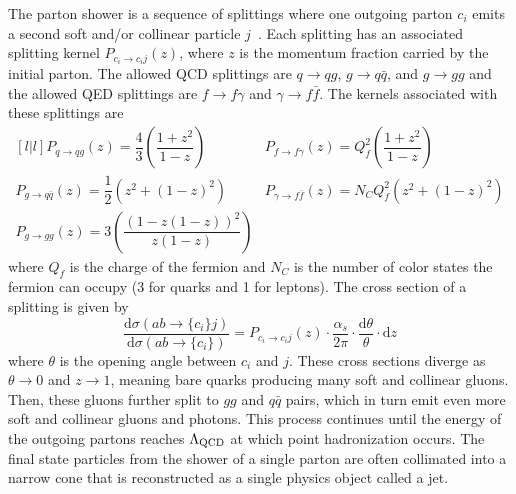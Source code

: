 The parton shower is a sequence of splittings where one outgoing parton $c_i$ emits a second soft and/or collinear particle $j$~\cite{Sjostrand2015}.
Each splitting has an associated splitting kernel $P_{c_i \rightarrow c_i j}(z)$, where $z$ is the momentum fraction carried by the initial parton.
The allowed QCD splittings are $q\rightarrow qg$, $g\rightarrow q \bar q$, and $g\rightarrow gg$ and the allowed QED splittings are $f\rightarrow f\gamma$ and $\gamma \rightarrow f \bar f$.
The kernels associated with these splittings are
\begin{equation}
  \begin{matrix}[l | l]
    P_{q\rightarrow qg}(z) = \dfrac{4}{3} \left( \dfrac{1+z^2}{1-z} \right)
    & P_{f \rightarrow f \gamma}(z) = Q_f^2 \left( \dfrac{1+z^2}{1-z} \right)
    \\ P_{g\rightarrow q \bar q}(z) = \dfrac{1}{2} \left( z^2 + (1-z)^2\right)
    & P_{\gamma \rightarrow f \bar f}(z) = N_C Q_f^2 \left( z^2 + (1-z)^2 \right) 
    \\ P_{g\rightarrow gg}(z) = 3 \left( \dfrac{(1-z(1-z))^2}{z(1-z)} \right)  & 
  \end{matrix}
\end{equation}
where $Q_f$ is the charge of the fermion and $N_C$ is the number of color states the fermion can occupy (3 for quarks and 1 for leptons).
The cross section of a splitting is given by
\begin{equation}
  \frac{\text{d}\sigma (ab\rightarrow \{c_i\}j)}{\text{d}\sigma (ab\rightarrow \{c_i\})}
  = P_{c_i\rightarrow c_i j}(z) \cdot \frac{\alpha_s}{2\pi} \cdot \frac{\text{d}\theta}{\theta} \cdot \text{d}z 
\end{equation}
where $\theta$ is the opening angle between $c_i$ and $j$.
These cross sections diverge as $\theta \rightarrow 0$ and $z \rightarrow 1$, meaning bare quarks producing many soft and collinear gluons.
Then, these gluons further split to $gg$ and $q\bar q$ pairs, which in turn emit even more soft and collinear gluons and photons.
This process continues until the energy of the outgoing partons reaches $\Lambda_{\text{QCD}}$ at which point hadronization occurs.
The final state particles from the shower of a single parton are often collimated into a narrow cone that is reconstructed as a single physics object called a jet.

